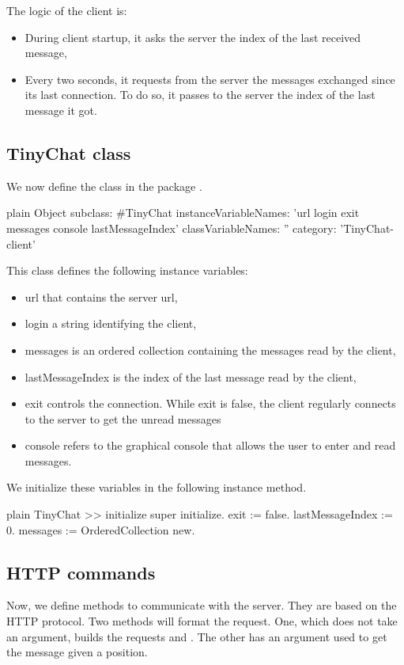 \documentclass[10pt,twoside,english]{_support/latex/sbabook/sbabook}
\begin{document}
The logic of the client is: 

\begin{itemize}
\item During client startup, it asks the server the index of the last received message, 
\item Every two seconds, it requests from the server the messages exchanged since its last connection. To do so, it passes to the server the index of the last message it got. 
\end{itemize}
\subsection{TinyChat class}
We now define the class  in the package . 

\begin{displaycode}{plain}
Object subclass: #TinyChat
	instanceVariableNames: 'url login exit messages console lastMessageIndex'
	classVariableNames: ''
	category: 'TinyChat-client'
\end{displaycode}

This class defines the following instance variables:

\begin{itemize}
\item url that contains the server url,
\item login a string identifying the client, 
\item messages is an ordered collection containing the messages read by the client, 
\item lastMessageIndex is the index of the last message read by the client, 
\item exit controls the connection. While exit is false, the client regularly connects to the server to get the unread messages
\item console refers to the graphical console that allows the user to enter and read messages. 
\end{itemize}

We initialize these variables in the following instance  method.

\begin{displaycode}{plain}
TinyChat >> initialize
	super initialize.
	exit := false.
	lastMessageIndex := 0.
	messages := OrderedCollection new.
\end{displaycode}
\subsection{HTTP commands}
Now, we define methods to communicate with the server. They are based on the HTTP protocol.
Two methods will format the request. One, which does not take an argument, builds the requests
 and . The other has an argument used to get the message given a position.
\end{document}

